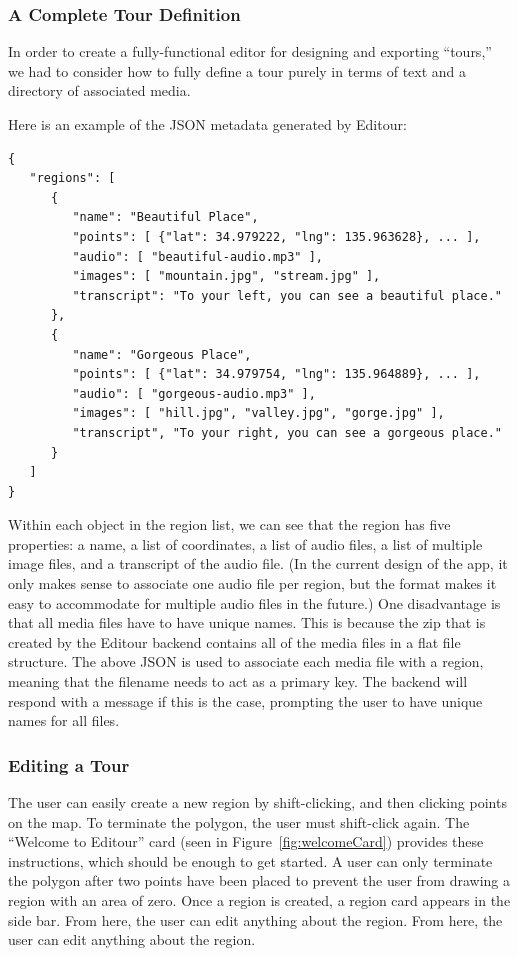 \documentclass[a4paper, 10pt, american, titlepage]{article}
\begin{document}
\subsubsection{A Complete Tour Definition}
\label{sec:tourDefinition}

In order to create a fully-functional editor for designing and exporting
``tours,'' we had to consider how to fully define a tour purely in terms
of text and a directory of associated media.

Here is an example of the JSON metadata generated by Editour:

\begin{verbatim}
{
   "regions": [
      {
         "name": "Beautiful Place",
         "points": [ {"lat": 34.979222, "lng": 135.963628}, ... ],
         "audio": [ "beautiful-audio.mp3" ],
         "images": [ "mountain.jpg", "stream.jpg" ],
         "transcript": "To your left, you can see a beautiful place."
      },
      {
         "name": "Gorgeous Place",
         "points": [ {"lat": 34.979754, "lng": 135.964889}, ... ],
         "audio": [ "gorgeous-audio.mp3" ],
         "images": [ "hill.jpg", "valley.jpg", "gorge.jpg" ],
         "transcript", "To your right, you can see a gorgeous place."
      }
   ]
}
\end{verbatim}

Within each object in the region list, we can see that the region has five
properties: a name, a list of coordinates, a list of audio files, a list of
multiple image files, and a transcript of the audio file. (In the current
design of the app, it only makes sense to associate one audio file per region,
but the format makes it easy to accommodate for multiple audio files in the
future.) One disadvantage is that all media files have to have unique names.
This is because the zip that is created by the Editour backend contains all of
the media files in a flat file structure. The above JSON is used to associate
each media file with a region, meaning that the filename needs to act as a
primary key. The backend will respond with a message if this is the case,
prompting the user to have unique names for all files.

\subsubsection{Editing a Tour}
\label{sec:editingATour}

The user can easily create a new region by shift-clicking, and then clicking
points on the map.  To terminate the polygon, the user must shift-click again.
The ``Welcome to Editour'' card (seen in Figure~\ref{fig:welcomeCard}) provides
these instructions, which should be enough to get started.  A user can only
terminate the polygon after two points have been placed to prevent the user
from drawing a region with an area of zero. Once a region is created, a region
card appears in the side bar. From here, the user can edit anything about the
region. From here, the user can edit anything about the region.
\end{document}
